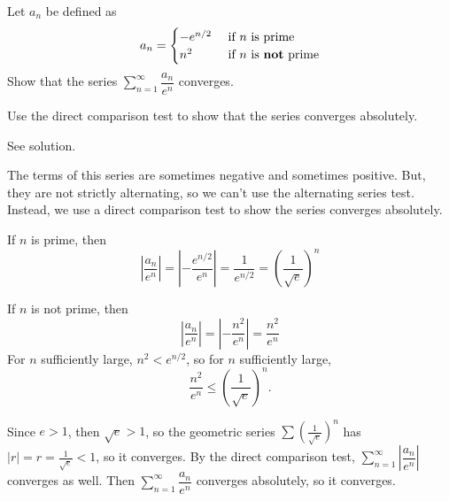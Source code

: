 \begin{Mquestion}
Let $a_n$ be defined as
\[a_n=\begin{cases}
-e^{n/2} & \text{ if $n$ is prime}\\
n^2 & \text{ if $n$ is \textbf{not} prime}
\end{cases}\]
Show that the series
$\displaystyle\sum_{n=1}^\infty\dfrac{a_n}{e^n}$  converges.
\end{Mquestion}
\begin{hint}
Use the direct comparison test to show that the series converges absolutely.
\end{hint}
\begin{answer}
See solution.
\end{answer}
\begin{solution}
The terms of this series are sometimes negative and sometimes positive. But, they are not strictly alternating, so we can't use the alternating series test. Instead, we use a direct comparison test to show the series converges absolutely.

If $n$ is prime, then
\[\left| \frac{a_n}{e^n}\right|=\left|-\frac{e^{n/2}}{e^n}\right|=\frac{1}{e^{n/2}}=\left(\frac{1}{\sqrt e}\right)^n\]

If $n$ is not prime, then
\[\left| \frac{a_n}{e^n}\right|=\left|-\frac{n^2}{e^n}\right|=\frac{n^2}{e^n}\]
For $n$ sufficiently large, $n^2<e^{n/2}$, so for $n$ sufficiently large,
\[\frac{n^2}{e^n}\le \left(\frac{1}{\sqrt{e}}\right)^n.\]

Since $e>1$, then $\sqrt{e}>1$, so the geometric series $\displaystyle\sum \left(\frac{1}{\sqrt{e}}\right)^n$ has $|r|=r=\frac{1}{\sqrt{e}}<1$, so it converges. By the direct comparison test, $\displaystyle\sum_{n=1}^\infty\left|\dfrac{a_n}{e^n}\right|$ converges as well. Then
$\displaystyle\sum_{n=1}^\infty\dfrac{a_n}{e^n}$ converges absolutely, so it converges.
\end{solution}


